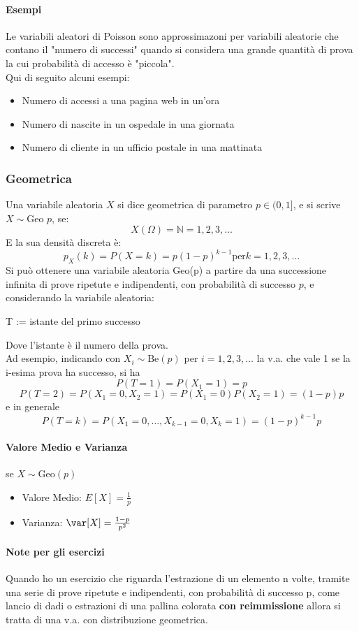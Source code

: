 \paragraph{Esempi}
Le variabili aleatori di Poisson sono approssimazoni per variabili aleatorie che contano il "numero di successi"
quando si considera una grande quantità di prova la cui probabilità di accesso è "piccola".
\\ Qui di seguito alcuni esempi:
\begin{itemize}
	\item Numero di accessi a una pagina web in un'ora
	\item Numero di nascite in un ospedale in una giornata
	\item Numero di cliente in un ufficio postale in una mattinata
\end{itemize}

\subsubsection{Geometrica}
Una variabile aleatoria $X$ si dice geometrica di parametro $p \in (0,1]$, e si scrive
$X \sim \text{Geo }p$, se:
\[X(\Omega)=\mathbb{N} = {1,2,3,\dots}\]
E la sua densità discreta è:
\[
	p_X (k) = P(X = k) = p(1-p)^{k-1} \text{per} k=1,2,3,\dots
\]
Si può ottenere una variabile aleatoria Geo(p) a partire da una successione infinita di prove ripetute
e indipendenti, con probabilità di successo $p$, e considerando la variabile aleatoria:
\begin{center}
	T := istante del primo successo
\end{center}
Dove l'istante è il numero della prova.
\\ Ad esempio, indicando con $X_i \sim \text{Be}(p)$ per $i=1,2,3,\dots$ la v.a. che vale 1
se la i-esima prova ha successo, si ha
\[
	P(T=1) = P(X_1 = 1) = p
\]
\[
	P(T=2) = P(X_1 = 0, X_2 = 1) = P(X_1 = 0)P(X_2 = 1) = (1-p)p
\]
e in generale
\[
	P(T=k) = P(X_1=0, \dots, X_{k-1} = 0, X_k = 1) = (1-p)^{k-1}p
\]
\paragraph*{Valore Medio e Varianza} se $X\sim \text{Geo}(p)$
\begin{itemize}
	\item Valore Medio: $E[X] = \frac{1}{p}$
	\item Varianza: $\var[X] = \frac{1-p}{p^2}$
\end{itemize}
\paragraph*{Note per gli esercizi}
Quando ho un esercizio che riguarda l'estrazione di un elemento n volte, tramite una serie
di prove ripetute e indipendenti, con probabilità di successo p, come lancio di dadi o
estrazioni di una pallina colorata \textbf{con reimmissione} allora si tratta di una v.a. con
distribuzione geometrica.


